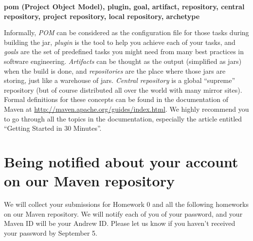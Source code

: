 \begin{center}
\textbf{pom (Project Object Model), plugin, goal, artifact, repository, central repository, project repository, local repository, archetype}
\end{center}

Informally, \emph{POM} can be considered as the configuration file for those tasks during building the jar, \emph{plugin} is the tool to help you achieve each of your tasks, and \emph{goals} are the set of predefined tasks you might need from many best practices in software engineering. \emph{Artifacts} can be thought as the output (simplified as jars) when the build is done, and \emph{repositories} are the place where those jars are storing, just like a warehouse of jars. \emph{Central repository} is a global ``supreme'' repository (but of course distributed all over the world with many mirror sites). Formal definitions for these concepts can be found in the documentation of Maven at \url{http://maven.apache.org/guides/index.html}. We highly recommend you to go through all the topics in the documentation, especially the article entitled ``Getting Started in 30 Minutes''.

\section{Being notified about your account on our Maven repository}

We will collect your submissions for Homework 0 and all the following homeworks on our Maven repository. We will notify each of you of your password, and your Maven ID will be your Andrew ID. Please let us know if you haven't received your password by September 5. 